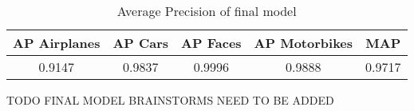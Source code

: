 \begin{table}[H]
\begin{tabular}{|ccccc|}
\hline
\textbf{AP Airplanes} & \textbf{AP Cars} & \textbf{AP Faces} & \textbf{AP Motorbikes} & \textbf{MAP}\\
\hline
0.9147 & 0.9837 & 0.9996 & 0.9888 & 0.9717\\
\hline
\end{tabular}
\caption{Average Precision of final model}
\label{tab:results_final}
\end{table}

TODO FINAL MODEL BRAINSTORMS NEED TO BE ADDED

